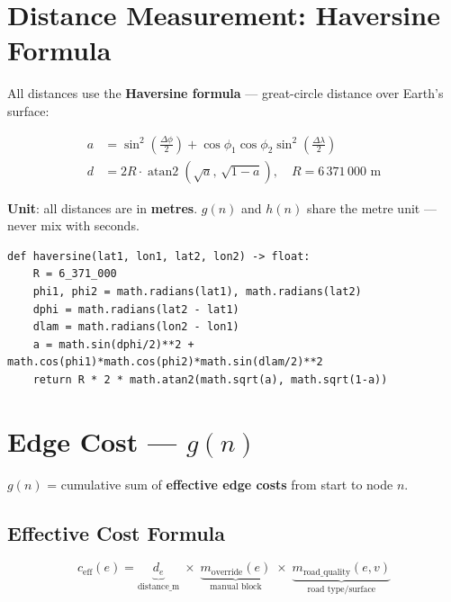 \documentclass[11pt,a4paper]{article}
\begin{document}
\section{Distance Measurement: Haversine Formula}

All distances use the \textbf{Haversine formula} — great-circle distance over Earth's surface:

\begin{align}
a &= \sin^2\!\left(\tfrac{\Delta\phi}{2}\right) + \cos\phi_1\cos\phi_2\sin^2\!\left(\tfrac{\Delta\lambda}{2}\right) \\
d &= 2R\cdot\operatorname{atan2}\!\left(\sqrt{a},\,\sqrt{1-a}\right), \quad R = 6\,371\,000\text{ m}
\end{align}

\textbf{Unit}: all distances are in \textbf{metres}. $g(n)$ and $h(n)$ share the metre unit — never mix with seconds.

\begin{lstlisting}[caption={src/graph/builder.py — haversine()}]
def haversine(lat1, lon1, lat2, lon2) -> float:
    R = 6_371_000
    phi1, phi2 = math.radians(lat1), math.radians(lat2)
    dphi = math.radians(lat2 - lat1)
    dlam = math.radians(lon2 - lon1)
    a = math.sin(dphi/2)**2 + math.cos(phi1)*math.cos(phi2)*math.sin(dlam/2)**2
    return R * 2 * math.atan2(math.sqrt(a), math.sqrt(1-a))
\end{lstlisting}

\section{Edge Cost — $g(n)$}

$g(n)$ = cumulative sum of \textbf{effective edge costs} from start to node $n$.

\subsection{Effective Cost Formula}
\[
c_{\text{eff}}(e) = \underbrace{d_e}_{\text{distance\_m}} \;\times\; \underbrace{m_{\text{override}}(e)}_{\text{manual block}} \;\times\; \underbrace{m_{\text{road\_quality}}(e, v)}_{\text{road type/surface}}
\]
\end{document}
